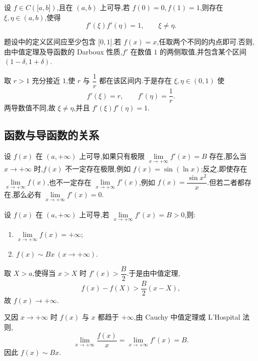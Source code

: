 \begin{example}
    设 $f\in C(\lbrack a,b\rbrack)$,且在 $(a,b)$ 上可导,若 $f(0)=0,f(1)=1$,则存在 $\xi,\eta\in(a,b)$,使得
    \[
        f'(\xi)f'(\eta)=1,
        \qquad \xi\neq\eta.
    \]
\end{example}
\exampleblank

\begin{solution}
    题设中的定义区间应至少包含 $\lbrack0,1\rbrack$.若 $f(x)=x$,任取两个不同的内点即可.否则,由中值定理及导函数的 Darboux 性质,$f'$ 在数值 $1$ 的两侧取值,并包含某个区间 $(1-\delta,1+\delta)$.

    取 $r>1$ 充分接近 $1$,使 $r$ 与 $\dfrac{1}{r}$ 都在该区间内.于是存在 $\xi,\eta\in(0,1)$ 使
    \[
        f'(\xi)=r,
        \qquad
        f'(\eta)=\dfrac{1}{r}.
    \]
    两导数值不同,故 $\xi\neq\eta$,并且 $f'(\xi)f'(\eta)=1$.
\end{solution}



\subsection{函数与导函数的关系}

设 $f(x)$ 在 $(a,+\infty)$ 上可导,如果只有极限 $\displaystyle\lim\limits_{x\to+\infty}f'(x)=B$ 存在,那么当 $x\to+\infty$ 时,$f(x)$ 不一定存在极限,例如 $f(x)=\sin(\ln x)$;反之,即使存在 $\displaystyle\lim\limits_{x\to+\infty}f(x)$,也不一定存在 $\displaystyle\lim\limits_{x\to+\infty}f'(x)$,例如 $f(x)=\dfrac{\sin x^2}{x}$.但若二者都存在,那么必有 $\displaystyle\lim\limits_{x\to+\infty}f'(x)=0$.

\begin{example}
    设 $f(x)$ 在 $(a,+\infty)$ 上可导,若 $\displaystyle\lim\limits_{x\to+\infty}f'(x)=B>0$,则:
    \begin{enumerate}
        \item $\displaystyle\lim\limits_{x\to+\infty}f(x)=+\infty$;
        \item $f(x)\sim Bx\ (x\to+\infty)$.
    \end{enumerate}
\end{example}
\exampleblank

\begin{solution}
    取 $X>a$,使得当 $x>X$ 时 $f'(x)>\dfrac{B}{2}$.于是由中值定理,
    \[
        f(x)-f(X)>\dfrac{B}{2}(x-X),
    \]
    故 $f(x)\to+\infty$.

    又因 $x\to+\infty$ 时 $f(x)$ 与 $x$ 都趋于 $+\infty$,由 Cauchy 中值定理或 L'Hospital 法则,
    \[
        \lim\limits_{x\to+\infty}\dfrac{f(x)}{x}
        =\lim\limits_{x\to+\infty}f'(x)=B.
    \]
    因此 $f(x)\sim Bx$.
\end{solution}


